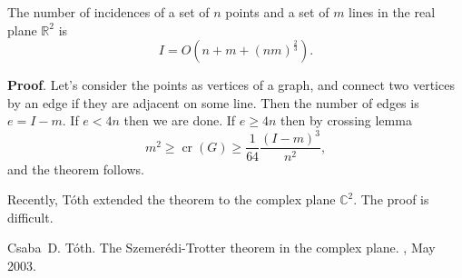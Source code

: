\documentclass[12pt]{article}
\DeclareMathOperator{\crn}{cr}
\begin{document}
The number of incidences of a set of $n$ points and a set of $m$ lines in the real plane $\mathbb{R}^2$ is
\begin{equation*}
I=O(n+m+(nm)^{\frac{2}{3}}).
\end{equation*}

\textbf{Proof}. Let's consider the points as vertices of a graph, and connect two vertices by an edge if they are adjacent on some line. Then the number of edges is $e=I-m$. If $e<4n$ then we are done. If $e \geq 4n$ then by crossing lemma
\begin{equation*}
m^2 \geq \crn(G) \geq \frac{1}{64}\frac{(I-m)^3}{n^2},
\end{equation*}
and the theorem follows.

Recently, T\'oth\cite{cite:toth_szemtrotcomplex} extended the theorem to the complex plane $\mathbb{C}^2$. The proof is difficult.

\begin{thebibliography}{1}

Csaba~D. T{\'o}th.
\newblock The {Szemer\'edi}-{Trotter} theorem in the complex plane.
\newblock {},
  May 2003.

\end{thebibliography}

\end{document}
